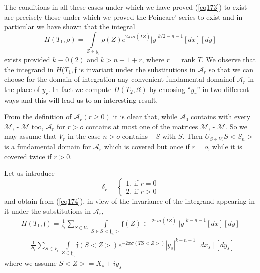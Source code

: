 The conditions in all these cases under which we have proved (\ref{eq173})
to exist are precisely those under which we proved the Poincare'
series to exist and in particular we have shown that the integral 
\begin{equation*}
H(T_1, \rho ) = \int\limits_{Z \in y_r} \rho (Z) e^{2 \pi i \sigma (T
  \bar{Z})} | y |^{k/2 - n - 1} [d x] [ d y] \tag{174}\label{eq174}  
\end{equation*}
exists provided $k \equiv 0 (2)$ and $k > n + 1 + r$, where $r = $
rank $T$. We observe that the integrand in $H(T_1, \mathfrak{f}$ is
invariant under the substitutions in $\mathcal{A}_r$ so that we can
choose for the domain of integration any convenient fundamental
domain\pageoriginale  of $\mathcal{A}_r$ in the place of $y_r$. In
fact we 
compute $H(T_2, \mathfrak{K})$ by choosing ``$ y_r$'' in two
different ways and this will lead us to an interesting result. 

From the definition of $\mathcal{A}_r (r \ge 0)$ it is clear that,
while $\mathcal{A}_0$ contains with every $\mathcal{M}$, -
$\mathcal{M}$ too, $\mathcal{A}_r$ for $r > o$ contains at most one of
the matrices $\mathcal{M}$, - $\mathcal{M}$. So we may assume that $ V_r
$ in the case $n > o$ contains $-S$ with $S$. Then $U_{S \in V_r} S
< S_n >$ is a fundamental domain for $\mathcal{A}_r$ which is covered
but once if $r = o$, while it is covered  twice if $r > 0$. 

Let us introduce
$$
\delta_r = 
\begin{cases}
1  .  \text{ if } r  =  0 \\
 2  . \text{ if } r >  0
\end{cases}
$$
and obtain from (\ref{eq174}), in view of the invariance of the integrand
appearing in it under the substitutions in $\mathcal{A}_r$, 
\begin{gather*}
H(T_1, \mathfrak{f}) = \frac{1}{\delta _r} \sum_{S \in V_r} \int\limits_{S \in
  S < \mathfrak{f}_n >} \mathfrak{f} (Z) \in^{- 2 \pi i \sigma (T
  \bar{Z})} | y |^{k - n - 1} [d x] [ d y]\\ 
= \frac{1}{S_r} \sum_{S \in V_r} \int\limits_{Z \in \mathfrak{f}_n}
\mathfrak{f} (S < Z >) e^{- 2 \pi \sigma ( T S < Z> )} | y_s |^{k - n -
  1} [d x_s] [d y _s] 
\end{gather*} 
where we assume $S < Z > = X_s +  i y_s$

